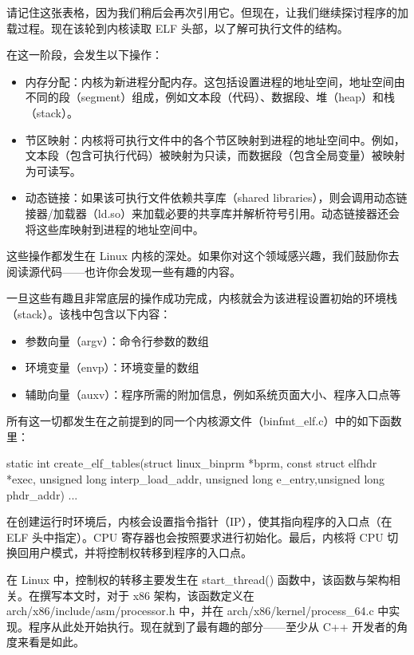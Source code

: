 请记住这张表格，因为我们稍后会再次引用它。但现在，让我们继续探讨程序的加载过程。现在该轮到内核读取 ELF 头部，以了解可执行文件的结构。

在这一阶段，会发生以下操作：

\begin{itemize}
\item 
内存分配：内核为新进程分配内存。这包括设置进程的地址空间，地址空间由不同的段（segment）组成，例如文本段（代码）、数据段、堆（heap）和栈（stack）。

\item 
节区映射：内核将可执行文件中的各个节区映射到进程的地址空间中。例如，文本段（包含可执行代码）被映射为只读，而数据段（包含全局变量）被映射为可读写。

\item 
动态链接：如果该可执行文件依赖共享库（shared libraries），则会调用动态链接器/加载器（ld.so）来加载必要的共享库并解析符号引用。动态链接器还会将这些库映射到进程的地址空间中。
\end{itemize}

这些操作都发生在 Linux 内核的深处。如果你对这个领域感兴趣，我们鼓励你去阅读源代码——也许你会发现一些有趣的内容。

一旦这些有趣且非常底层的操作成功完成，内核就会为该进程设置初始的环境栈（stack）。该栈中包含以下内容：

\begin{itemize}
\item 
参数向量（argv）：命令行参数的数组

\item 
环境变量（envp）：环境变量的数组

\item 
辅助向量（auxv）：程序所需的附加信息，例如系统页面大小、程序入口点等
\end{itemize}

所有这一切都发生在之前提到的同一个内核源文件（binfmt\_elf.c）中的如下函数里：

\begin{cpp}
static int create_elf_tables(struct linux_binprm *bprm,
const struct elfhdr *exec, unsigned long interp_load_addr,
unsigned long e_entry,unsigned long phdr_addr) { ... }
\end{cpp}

在创建运行时环境后，内核会设置指令指针（IP），使其指向程序的入口点（在 ELF 头中指定）。CPU 寄存器也会按照要求进行初始化。最后，内核将 CPU 切换回用户模式，并将控制权转移到程序的入口点。

在 Linux 中，控制权的转移主要发生在 start\_thread() 函数中，该函数与架构相关。在撰写本文时，对于 x86 架构，该函数定义在 arch/x86/include/asm/processor.h 中，并在 arch/x86/kernel/process\_64.c 中实现。程序从此处开始执行。现在就到了最有趣的部分——至少从 C++ 开发者的角度来看是如此。

